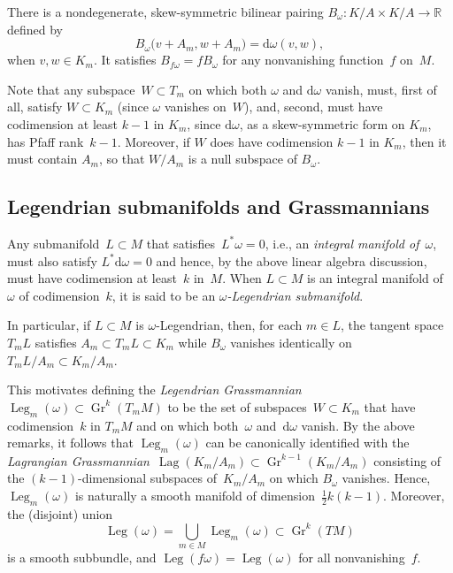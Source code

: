 \documentclass[pdftex]{sigma}
\renewcommand{\d}{\mathrm{d}}%
\newcommand{\bbR}{{\mathbb R}}
\newcommand{\Gr}{\operatorname{Gr}}
\newcommand{\Leg}{\operatorname{Leg}}
\newcommand{\Lag}{\operatorname{Lag}}
\numberwithin{equation}{section}
\begin{document}
There is a nondegenerate, skew-symmetric bilinear pairing
$B_\omega \colon K{/}A\times K{/}A\to\bbR$
defined by
\[
B_\omega\bigl(v{+}A_m,w{+}A_m\bigr) = \mathrm{d}\omega(v,w),
\]
when $v,w\in K_m$. It satisfies $B_{f\omega} = fB_\omega$
for any nonvanishing function~$f$ on~$M$.

Note that any subspace~$W\subset T_m$ on which both $\omega$ and $\d\omega$
vanish, must, first of all, satisfy $W\subset K_m$
(since $\omega$ vanishes on~$W$), and, second, must have codimension
at least $k{-}1$ in $K_m$, since $\d\omega$, as a skew-symmetric form
on $K_m$, has Pfaff rank~$k{-}1$.
Moreover, if $W$ does have codimension $k{-}1$ in $K_m$,
then it must contain $A_m$, so that $W/A_m$ is a null subspace of $B_\omega$.

\subsection{Legendrian submanifolds and Grassmannians}
Any submanifold~$L\subset M$ that satisfies~$L^*\omega=0$,
i.e., an \emph{integral manifold of~$\omega$},
must also satisfy $L^*\d\omega=0$
and hence, by the above linear algebra discussion,
must have codimension at least~$k$ in~$M$.
When $L\subset M$ is an integral manifold of~$\omega$ of codimension~$k$,
it is said to be an \emph{$\omega$-Legendrian submanifold}.

In particular, if $L\subset M$ is $\omega$-Legendrian,
then, for each $m\in L$, the tangent space $T_mL$
satisfies $A_m\subset T_mL\subset K_m$
while $B_\omega$ vanishes identically on $T_mL/A_m\subset K_m/A_m$.

This motivates defining
the \emph{Legendrian Grassmannian}~$\Leg_m(\omega)\subset\Gr^k(T_mM)$
to be the set of subspaces~$W\subset K_m$
that have codimension~$k$ in $T_mM$
and on which both~$\omega$ and~$\d\omega$ vanish.
By the above remarks, it follows that $\Leg_m(\omega)$
can be canonically identified with the
\emph{Lagrangian Grassmannian}~$\Lag(K_m/A_m)\subset\Gr^{k-1}(K_m/A_m)$
consisting of the $(k{-}1)$-dimensional subspaces of~$K_m/A_m$
on which $B_\omega$ vanishes.
Hence, $\Leg_m(\omega)$ is naturally a smooth manifold
of dimension~$\tfrac12k(k{-}1)$.
Moreover, the (disjoint) union
\[
\Leg(\omega) = \bigcup_{m\in M} \Leg_m(\omega)\subset \Gr^k(TM)
\]
is a smooth subbundle,
and $\Leg(f\omega)=\Leg(\omega)$ for all nonvanishing~$f$.
\end{document}
